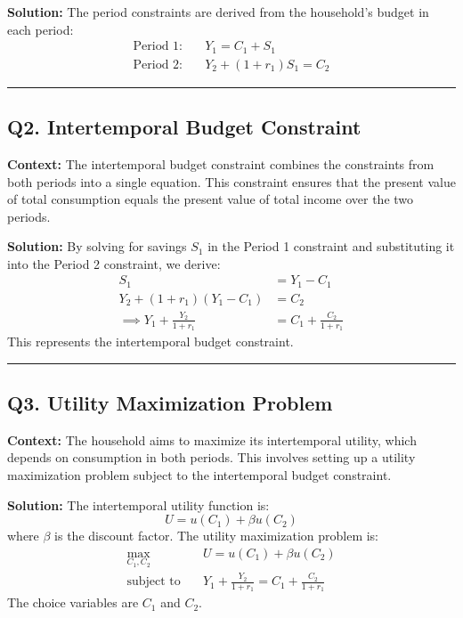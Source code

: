\documentclass{article}
\begin{document}
\textbf{Solution:} The period constraints are derived from the household's budget in each period:
\begin{align*}
    \text{Period 1:} \quad & Y_1 = C_1 + S_1 \\
    \text{Period 2:} \quad & Y_2 + (1 + r_1)S_1 = C_2
\end{align*}

\noindent\rule{\linewidth}{0.5pt}

\subsection*{Q2. Intertemporal Budget Constraint}

\textbf{Context:} The intertemporal budget constraint combines the constraints from both periods into a single equation. This constraint ensures that the present value of total consumption equals the present value of total income over the two periods.

\textbf{Solution:} By solving for savings \(S_1\) in the Period 1 constraint and substituting it into the Period 2 constraint, we derive:
\begin{align*}
    S_1 &= Y_1 - C_1 \\
    Y_2 + (1 + r_1)(Y_1 - C_1) &= C_2 \\
    \implies Y_1 + \frac{Y_2}{1 + r_1} &= C_1 + \frac{C_2}{1 + r_1}
\end{align*}
This represents the intertemporal budget constraint.

\noindent\rule{\linewidth}{0.5pt}

\subsection*{Q3. Utility Maximization Problem}

\textbf{Context:} The household aims to maximize its intertemporal utility, which depends on consumption in both periods. This involves setting up a utility maximization problem subject to the intertemporal budget constraint.

\textbf{Solution:} The intertemporal utility function is:
\[
U = u(C_1) + \beta u(C_2)
\]
where \( \beta \) is the discount factor. The utility maximization problem is:
\begin{align*}
    \max_{C_1, C_2} &\quad U = u(C_1) + \beta u(C_2) \\
    \text{subject to} &\quad Y_1 + \frac{Y_2}{1 + r_1} = C_1 + \frac{C_2}{1 + r_1}
\end{align*}
The choice variables are \( C_1 \) and \( C_2 \).
\end{document}
